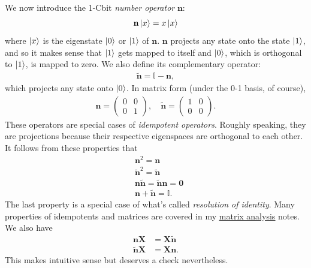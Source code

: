 \documentclass{book}
\theoremstyle{definition}
\newcommand{\nn}{\nonumber}
\begin{document}
We now introduce the 1-Cbit \textit{number operator} $\mathbf{n}$:
\begin{align}
\mathbf{n}\ket{x} = x\ket{x}
\end{align}
where $\ket{x}$ is the eigenstate $\ket{0}$ or $\ket{1}$ of $\mathbf{n}$. $\mathbf{n}$ projects any state onto the state $\ket{1}$, and so it makes sense that $\ket{1}$ gets mapped to itself and $\ket{0}$, which is orthogonal to $\ket{1}$, is mapped to zero.  We also define its complementary operator:
\begin{align}
\tilde{\mathbf{n}} = \mathbb{I} - \mathbf{n},
\end{align}
which projects any state onto $\ket{0}$. In matrix form (under the 0-1 basis, of course), 
\begin{align}
\mathbf{n} = \begin{pmatrix}
0 & 0 \\ 0 & 1
\end{pmatrix}, \quad \tilde{\mathbf{n}} = \begin{pmatrix}
1&0\\0&0
\end{pmatrix}.
\end{align}
These operators are special cases of \textit{idempotent operators}. Roughly speaking, they are projections because their respective eigenspaces are orthogonal to each other. It follows from these properties that
\begin{align}
&\mathbf{n}^2  =  \mathbf{n} \nn\\
&\tilde{\mathbf{n}}^2  =  \tilde{\mathbf{n}} \nn\\
&\mathbf{n}\tilde{\mathbf{n}} =  \tilde{\mathbf{n}}\mathbf{n} = \mathbf{0}\nn\\
&\mathbf{n} + \tilde{\mathbf{n}}  = \mathbb{I}.
\end{align}
The last property is a special case of what's called \textit{resolution of identity}. Many properties of idempotents and matrices are covered in my \href{https://huanqbui.com/LaTeX projects/Matrix_Analysis/HuanBui_MatrixAnalysis.pdf}{\underline{matrix analysis}} notes.\\

We also have
\begin{align}
\mathbf{n}\mathbf{X} &= \mathbf{X}\tilde{\mathbf{n}}\nn\\
\tilde{\mathbf{n}}\mathbf{X} &= \mathbf{X}{\mathbf{n}}.
\end{align}
This makes intuitive sense but deserves a check nevertheless. \\
\end{document}
